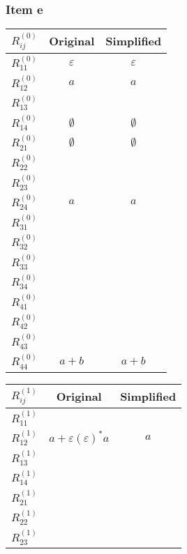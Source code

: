 {\subsubsection{Item e}
\begin{minipage}[c]{0.49\textwidth}
	\begin{center}
		\begin{tabular}{r || c | c}
			$R_{ij}^{(0)}$ & Original & Simplified \\ \hline
			$R_{11}^{(0)}$ & $\varepsilon$ &$\varepsilon$ \\
			$R_{12}^{(0)}$ & $a$ & $a$  \\
			$R_{13}^{(0)}$ &   &   \\
			$R_{14}^{(0)}$ & $\emptyset$ & $\emptyset$  \\ 
			$R_{21}^{(0)}$ & $\emptyset$ & $\emptyset$   \\
			$R_{22}^{(0)}$ &   &   \\
			$R_{23}^{(0)}$ &   &   \\
			$R_{24}^{(0)}$ & $a$ & $a$  \\ 
			$R_{31}^{(0)}$ &   &   \\
			$R_{32}^{(0)}$ &   &   \\
			$R_{33}^{(0)}$ &   &   \\
			$R_{34}^{(0)}$ &   &   \\
			$R_{41}^{(0)}$ &   &   \\
			$R_{42}^{(0)}$ &   &   \\
			$R_{43}^{(0)}$ &   &   \\
			$R_{44}^{(0)}$ & $a+b$ &  $a+b$ \\  
		\end{tabular}
	\end{center}
\end{minipage}
\begin{minipage}[c]{0.49\textwidth}
	\begin{center}
		\begin{tabular}{r || c | c}
			$R_{ij}^{(1)}$ & Original & Simplified \\ \hline
			$R_{11}^{(1)}$ &   &   \\
			$R_{12}^{(1)}$ & $a+\varepsilon(\varepsilon)^*a$ & $a$ \\
			$R_{13}^{(1)}$ &   &   \\
			$R_{14}^{(1)}$ &   &   \\ 
			$R_{21}^{(1)}$ &   &   \\
			$R_{22}^{(1)}$ &   &   \\
			$R_{23}^{(1)}$ &   &   \\

\end{tabular}
\end{center}
\end{minipage}}
